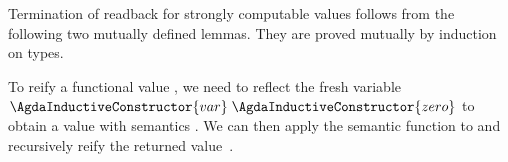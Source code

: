 \documentclass[preliminary,copyright,creativecommons]{eptcs}
\newenvironment{code}{\verbatim}{\endverbatim}
\begin{document}
\noindent
Termination of readback for strongly computable values follows from
the following two mutually defined lemmas. They are proved mutually by
induction on types.

To reify a functional value , we need to reflect the fresh
variable $\AgdaInductiveConstructor{var}\;\AgdaInductiveConstructor{zero}$ to obtain a value  with semantics
.  We can then apply the semantic function  to
 and recursively reify the returned value~.

\begin{code}\>\<\\
\>[0]\<[2]\>[2] \AgdaSymbol{:} \AgdaSymbol{\}}  \AgdaSymbol{(} \AgdaSymbol{:}   \AgdaSymbol{)}         \<\\
\>[0]\<[2]\>[2]  \<[17]\>[17]\AgdaSymbol{(} \AgdaSymbol{\_)} \<[25]\>[25]\AgdaSymbol{(} \AgdaInductiveConstructor{,} \AgdaSymbol{)} \<[35]\>[35]\AgdaSymbol{=}   \AgdaInductiveConstructor{,}   \<\\
\>[0]\<[2]\>[2] \AgdaSymbol{(}  \AgdaSymbol{)} \<[17]\>[17] \<[25]\>[25] \<[35]\>[35]\AgdaSymbol{=}\<\\
\>[2]\<[4]\>[4]  \<[22]\>[22]\AgdaSymbol{=}  \AgdaSymbol{(} \AgdaSymbol{)}\<\\
\>[4]\<[8]\>[8] \<[22]\>[22]\AgdaSymbol{=}   \AgdaSymbol{(} \AgdaSymbol{)} \AgdaSymbol{(}  \AgdaInductiveConstructor{,} \AgdaSymbol{)}\<\\
\>[4]\<[8]\>[8] \AgdaInductiveConstructor{,}  \AgdaInductiveConstructor{,}  \<[22]\>[22]\AgdaSymbol{=}    \<\\

\end{code}
\end{document}
